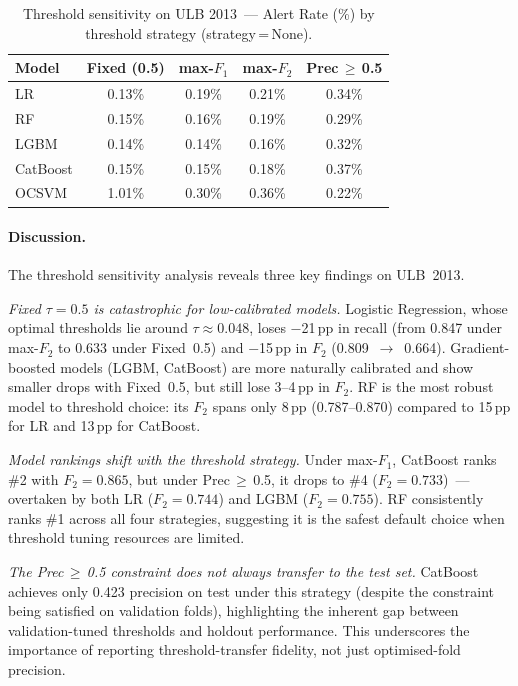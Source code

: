 \begin{table}[ht]
\centering
\caption{Threshold sensitivity on ULB 2013~--- Alert Rate (\%) by threshold strategy (strategy\,=\,None).}
\label{tab:threshold_ulb_alert}
\begin{tabular}{l c c c c}
\toprule
Model & Fixed (0.5) & max-$F_1$ & max-$F_2$ & Prec\,$\geq$\,0.5 \\
\midrule
LR         & 0.13\% & 0.19\% & 0.21\% & 0.34\% \\
RF         & 0.15\% & 0.16\% & 0.19\% & 0.29\% \\
LGBM       & 0.14\% & 0.14\% & 0.16\% & 0.32\% \\
CatBoost   & 0.15\% & 0.15\% & 0.18\% & 0.37\% \\
OCSVM      & 1.01\% & 0.30\% & 0.36\% & 0.22\% \\
\bottomrule
\end{tabular}
\end{table}

\paragraph{Discussion.}
The threshold sensitivity analysis reveals three key findings on ULB~2013.

\textit{Fixed $\tau=0.5$ is catastrophic for low-calibrated models.}
Logistic Regression, whose optimal thresholds lie around $\tau\approx0.048$,
loses $-$21\,pp in recall (from 0.847 under max-$F_2$ to 0.633 under Fixed~0.5)
and $-$15\,pp in $F_2$ (0.809~$\to$~0.664).
Gradient-boosted models (LGBM, CatBoost) are more naturally calibrated
and show smaller drops with Fixed~0.5, but still lose 3--4\,pp in $F_2$.
RF is the most robust model to threshold choice:
its $F_2$ spans only 8\,pp (0.787--0.870) compared to 15\,pp for LR and 13\,pp for CatBoost.

\textit{Model rankings shift with the threshold strategy.}
Under max-$F_1$, CatBoost ranks \#2 with $F_2=0.865$,
but under Prec\,$\geq$\,0.5, it drops to \#4 ($F_2=0.733$)~---
overtaken by both LR ($F_2=0.744$) and LGBM ($F_2=0.755$).
RF consistently ranks \#1 across all four strategies,
suggesting it is the safest default choice when threshold tuning resources are limited.

\textit{The Prec\,$\geq$\,0.5 constraint does not always transfer to the test set.}
CatBoost achieves only 0.423 precision on test under this strategy
(despite the constraint being satisfied on validation folds),
highlighting the inherent gap between validation-tuned thresholds and holdout performance.
This underscores the importance of reporting threshold-transfer fidelity,
not just optimised-fold precision.

